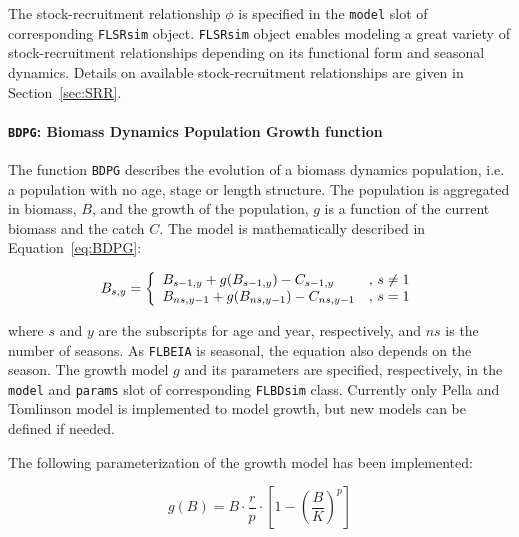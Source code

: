 	The stock-recruitment relationship $\phi$ is specified in the \texttt{model} slot of corresponding 
	\texttt{FLSRsim} object. \texttt{FLSRsim} object enables modeling a great variety of stock-recruitment relationships depending 
	on its functional form and seasonal dynamics. Details on available stock-recruitment relationships are given in Section~\ref{sec:SRR}.
	
	
\paragraph{{\texttt{BDPG}: Biomass Dynamics Population Growth function}} \hspace{0pt} \smallskip

	The function \texttt{BDPG} describes the evolution of a biomass dynamics population, i.e. a population with no 
  age, stage or length structure. The population is aggregated in biomass, $B$, and the growth of the population, $g$
  is a function of the current biomass and the catch $C$. The model is mathematically described in Equation~\ref{eq:BDPG}: 
	
	\begin{equation}
		B_{s,y} = \left\{ 
				\begin{array}{l l}
	 					B_{s-1,y}  + g(B_{s-1,y}) - C_{s-1,y}  & \text{, } s \neq 1\\
	 					B_{ns,y-1} + g(B_{ns,y-1}) - C_{ns,y-1}& \text{, } s = 1
  			\end{array} \right.
  	\label{eq:BDPG}
	\end{equation}
  
  \noindent where $s$ and $y$ are the subscripts for age and year, respectively, and $ns$ is the number of seasons.
	As \texttt{FLBEIA} is seasonal, the equation also depends on the season. The growth model $g$ and its parameters are 
	specified, respectively, in the \texttt{model} and \texttt{params} slot of corresponding \texttt{FLBDsim} class.  
	Currently only Pella and Tomlinson model \citep{Pella1969} is	implemented to model growth, but new models can be defined if needed.
	
	The following parameterization of the growth model has been implemented:
	
	\begin{equation}
		g(B) = B\cdot \frac{r}{p}\cdot\left[1-\left(\frac{B}{K}\right)^p\right]
	\end{equation}
  
